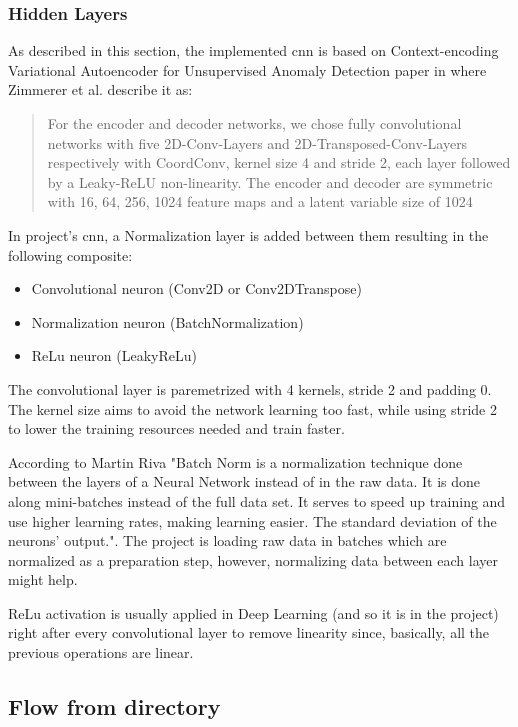 \subsubsection{Hidden Layers}

As described in this section, the implemented \acrshort{cnn} is based on Context-encoding Variational Autoencoder for Unsupervised Anomaly Detection paper \cite{cevaemodel} in where Zimmerer et al. describe it as: 

\begin{quote}
    For the encoder and decoder networks, we chose fully convolutional networks with five 2D-Conv-Layers and 2D-Transposed-Conv-Layers respectively with CoordConv, kernel size 4 and stride 2, each layer followed by a Leaky-ReLU non-linearity. The encoder and decoder are symmetric with 16, 64, 256, 1024 feature maps and a latent variable size of 1024
\end{quote}

In project's \acrfull{cnn}, a Normalization layer is added between them resulting in the following composite:

\begin{itemize}
    \item Convolutional neuron (Conv2D or Conv2DTranspose) 
    \item Normalization neuron (BatchNormalization)
    \item ReLu neuron (LeakyReLu)
\end{itemize}

The convolutional layer is paremetrized with 4 kernels, stride 2 and padding 0. The kernel size aims to avoid the network learning too fast, while using stride 2 to lower the training resources needed and train faster.

According to Martin Riva \cite{batchnorm} "Batch Norm is a normalization technique done between the layers of a Neural Network instead of in the raw data. It is done along mini-batches instead of the full data set. It serves to speed up training and use higher learning rates, making learning easier. The standard deviation of the neurons' output.". The project is loading raw data in batches which are normalized as a preparation step, however, normalizing data between each layer might help.

ReLu activation is usually applied in Deep Learning (and so it is in the project) right after every convolutional layer to remove linearity since, basically, all the previous operations are linear. 

\subsection{Flow from directory}

